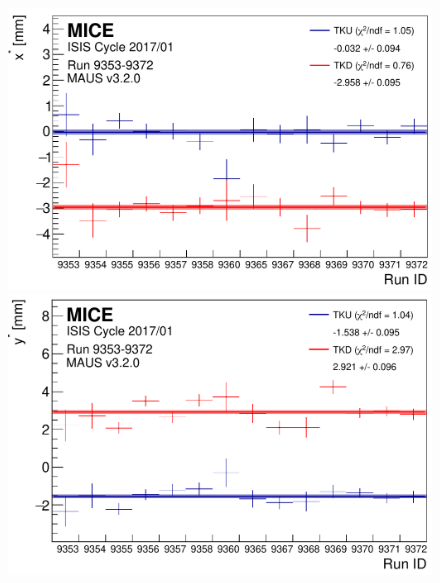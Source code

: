 \begin{figure}
  \begin{center}
    \begin{minipage}[b]{.45\textwidth}
      \begin{center}
        \includegraphics[width=\textwidth]{data_final/x_bestfit_edit.pdf}
      \end{center}
    \end{minipage}
    \hfill
    \begin{minipage}[b]{.45\textwidth}
      \begin{center}
        \includegraphics[width=\textwidth]{data_final/y_bestfit_edit.pdf}
      \end{center}
    \end{minipage}
    \begin{minipage}[b]{.45\textwidth}
      \begin{center}

\end{center}
\end{minipage}
\end{center}
\end{figure}
